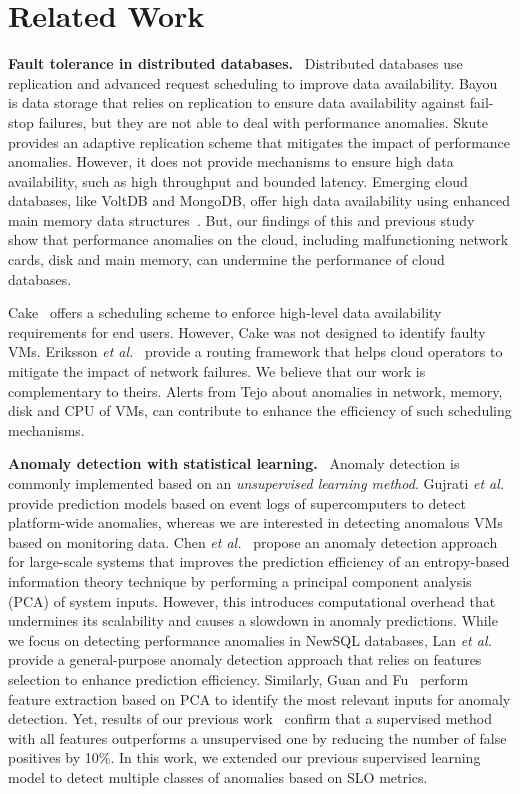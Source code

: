 \section{Related Work}
\label{sec:related_work}

\noindent
{\bf Fault tolerance in distributed databases.} \ Distributed databases use replication and advanced request scheduling to improve data availability. Bayou~\cite{petersen1996bayou} is data storage that relies on replication to ensure data availability against fail-stop failures, but they are not able to deal with performance anomalies. Skute~\cite{bonvin2010self} provides an adaptive replication scheme that mitigates the impact of performance anomalies. However, it does not provide mechanisms to ensure high data availability, such as high throughput and bounded latency. Emerging cloud databases, like VoltDB and MongoDB, offer high data availability using enhanced main memory data structures~\cite{stonebraker2010sql}. But, our findings of this and previous study~\cite{silvestre2014anomaly} show that performance anomalies on the cloud, including malfunctioning network cards, disk and main memory, can undermine the performance of cloud databases. 

Cake~\cite{wang2012cake} offers a scheduling scheme to enforce high-level data availability requirements for end users. However, Cake was not designed to identify faulty VMs. Eriksson \emph{et al.}~\cite{eriksson2013riskroute} provide a routing framework that helps cloud operators to mitigate the impact of network failures. We believe that our work is complementary to theirs. Alerts from Tejo about anomalies in network, memory, disk and CPU of VMs, can contribute to enhance the efficiency of such scheduling mechanisms.

\noindent
{\bf Anomaly detection with statistical learning.} \ Anomaly detection is commonly implemented based on an \emph{unsupervised learning method}. Gujrati \emph{et al.}~\cite{gujrati2007meta} provide prediction models based on event logs of supercomputers to detect platform-wide anomalies, whereas we are interested in detecting anomalous VMs based on monitoring data. Chen \emph{et al.}~\cite{chen2007failure} propose an anomaly detection approach for large-scale systems that improves the prediction efficiency of an entropy-based information theory technique by performing a principal component analysis (PCA) of system inputs. However, this introduces computational overhead that undermines its scalability and causes a slowdown in anomaly predictions. While we focus on detecting performance anomalies in NewSQL databases, Lan \emph{et al.}~\cite{lan2010toward} provide a general-purpose anomaly detection approach that relies on features selection to enhance prediction efficiency. Similarly, Guan and Fu~\cite{guan2013adaptive} perform feature extraction based on PCA to identify the most relevant inputs for anomaly detection. Yet, results of our previous work~\cite{silvestre2014anomaly} confirm that a supervised method with all features outperforms a unsupervised one by reducing the number of false positives by 10\%. In this work, we extended our previous supervised learning model to detect multiple classes of anomalies based on SLO metrics.

